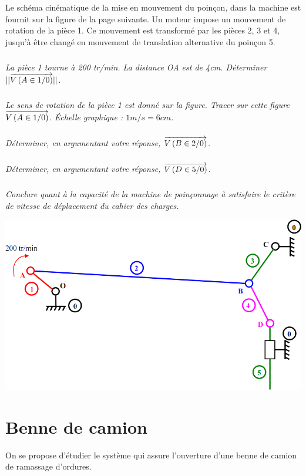 \documentclass[10pt]{article}
\begin{document}
Le schéma cinématique de la mise en mouvement du poinçon, dans la machine est fournit sur la figure de la page suivante. Un moteur impose un mouvement de rotation de la pièce 1. Ce mouvement est transformé par les pièces 2, 3 et 4, jusqu'à être changé en mouvement de translation alternative du poinçon 5. 

\subparagraph{}
\textit{La pièce 1 tourne à 200 tr/min. La distance OA est de 4cm. Déterminer $||\overrightarrow{V\left( {A} \in {1}/{0}\right)}||$.}

\subparagraph{}
\textit{Le sens de rotation de la pièce 1 est donné sur la figure. Tracer sur cette figure $\overrightarrow{V\left( {A} \in {1}/{0}\right)}$. Échelle graphique : $1m/s = 6cm$.}

\subparagraph{}
\textit{Déterminer, en argumentant votre réponse, $\overrightarrow{V\left( {B} \in {2}/{0}\right)}$.}

\subparagraph{}
\textit{Déterminer, en argumentant votre réponse, $\overrightarrow{V\left( {D} \in {5}/{0}\right)}$.}

\subparagraph{}
\textit{Conclure quant à la capacité de la machine de poinçonnage à satisfaire le critère de vitesse de déplacement du cahier des charges.}

\vspace{6cm}

\begin{center}
\includegraphics[width=.6\textwidth]{images/fig2}
\end{center}

\newpage

\section{Benne de camion}

\setcounter{subparagraph}{0}
On se propose d'étudier le système qui assure l'ouverture d'une benne de camion de ramassage d'ordures.
\end{document}
